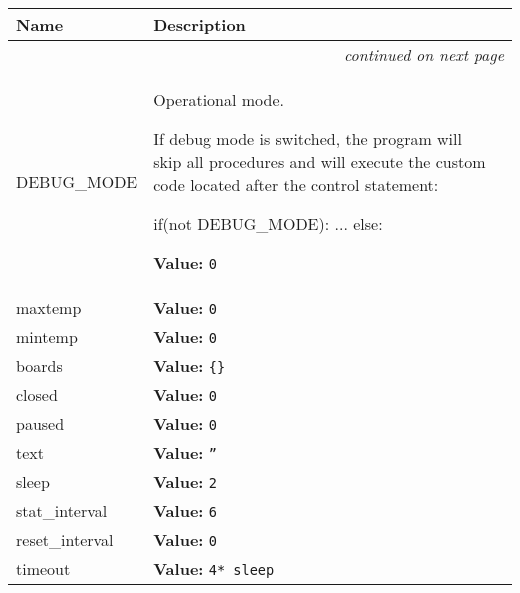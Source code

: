     \vspace{-1cm}
\hspace{\varindent}\begin{longtable}{|p{\varnamewidth}|p{\vardescrwidth}|l}
\cline{1-2}
\cline{1-2} \centering \textbf{Name} & \centering \textbf{Description}& \\
\cline{1-2}
\endhead\cline{1-2}\multicolumn{3}{r}{\small\textit{continued on next page}}\\\endfoot\cline{1-2}
\endlastfoot\raggedright D\-E\-B\-U\-G\-\_\-M\-O\-D\-E\- & \raggedright Operational mode.

          If debug mode is switched, the program will skip all procedures 
          and will execute the custom code located after the control 
          statement:

          if(not DEBUG\_MODE): ... else:

\textbf{Value:} 
{\tt 0}&\\
\cline{1-2}
\raggedright m\-a\-x\-t\-e\-m\-p\- & \raggedright \textbf{Value:} 
{\tt 0}&\\
\cline{1-2}
\raggedright m\-i\-n\-t\-e\-m\-p\- & \raggedright \textbf{Value:} 
{\tt 0}&\\
\cline{1-2}
\raggedright b\-o\-a\-r\-d\-s\- & \raggedright \textbf{Value:} 
{\tt \{\}}&\\
\cline{1-2}
\raggedright c\-l\-o\-s\-e\-d\- & \raggedright \textbf{Value:} 
{\tt 0}&\\
\cline{1-2}
\raggedright p\-a\-u\-s\-e\-d\- & \raggedright \textbf{Value:} 
{\tt 0}&\\
\cline{1-2}
\raggedright t\-e\-x\-t\- & \raggedright \textbf{Value:} 
{\tt ''}&\\
\cline{1-2}
\raggedright s\-l\-e\-e\-p\- & \raggedright \textbf{Value:} 
{\tt 2}&\\
\cline{1-2}
\raggedright s\-t\-a\-t\-\_\-i\-n\-t\-e\-r\-v\-a\-l\- & \raggedright \textbf{Value:} 
{\tt 6}&\\
\cline{1-2}
\raggedright r\-e\-s\-e\-t\-\_\-i\-n\-t\-e\-r\-v\-a\-l\- & \raggedright \textbf{Value:} 
{\tt 0}&\\
\cline{1-2}
\raggedright t\-i\-m\-e\-o\-u\-t\- & \raggedright \textbf{Value:} 
{\tt 4* sleep}&\\
\cline{1-2}
\end{longtable}

